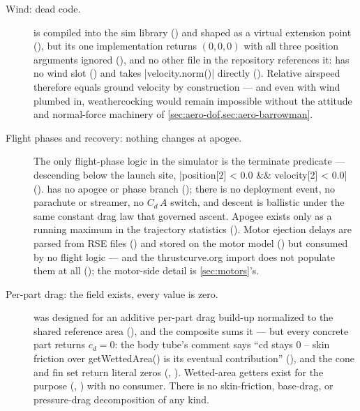 \begin{description}
  \item[Wind: dead code. \fabsent]  is compiled into the sim library
  () and shaped as a virtual extension point
  (), but its one implementation returns $(0,0,0)$ with all three
  position arguments ignored (), and no other file in the repository
  references it:  has no wind slot () and
   takes \cppinline|velocity.norm()| directly ().
  Relative airspeed therefore equals ground velocity by construction --- and even with wind
  plumbed in, weathercocking would remain impossible without the attitude and normal-force
  machinery of \cref{sec:aero-dof,sec:aero-barrowman}.

  \item[Flight phases and recovery: nothing changes at apogee. \fabsent] The only flight-phase
  logic in the simulator is the terminate predicate --- descending below the launch site,
  \cppinline|position[2] < 0.0 && velocity[2] < 0.0| ().
   has no apogee or phase branch (); there is no
  deployment event, no parachute or streamer, no $C_d\,A$ switch, and descent is ballistic under
  the same constant drag law that governed ascent. Apogee exists only as a running maximum in the
  trajectory statistics (). Motor ejection delays are parsed
  from RSE files () and stored on the motor model
  () but consumed by no flight logic --- and the thrustcurve.org
  import does not populate them at all (); the motor-side
  detail is \cref{sec:motors}'s.

  \item[Per-part drag: the field exists, every value is zero. \fpartial] 
  was designed for an additive per-part drag build-up normalized to the shared reference area
  (), and the composite sums it --- but every concrete part returns
  $c_d = 0$: the body tube's comment says ``cd stays 0 -- skin friction over getWettedArea() is
  its eventual contribution'' (), and the cone and fin set
  return literal zeros (,
  ). Wetted-area getters exist for the purpose
  (, ) with no consumer. There is
  no skin-friction, base-drag, or pressure-drag decomposition of any kind.


\end{description}
